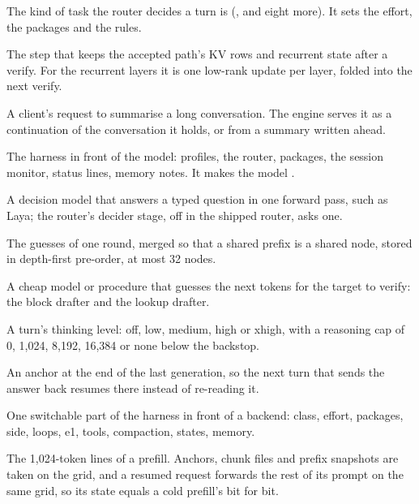 \begin{description}[style=unboxed, leftmargin=0pt, itemsep=.5ex, font=\normalfont\bfseries]
\item[class] The kind of task the router decides a turn is (,  and eight more). It sets the effort, the packages and the rules.

\item[commit] The step that keeps the accepted path's KV rows and recurrent state after a verify. For the recurrent layers it is one low-rank update per layer, folded into the next verify.

\item[compaction] A client's request to summarise a long conversation. The engine serves it as a continuation of the conversation it holds, or from a summary written ahead.

\item[conductor] The harness in front of the model: profiles, the router, packages, the session monitor, status lines, memory notes. It makes the model .

\item[decider] A decision model that answers a typed question in one forward pass, such as Laya; the router's decider stage, off in the shipped router, asks one.

\item[draft tree] The guesses of one round, merged so that a shared prefix is a shared node, stored in depth-first pre-order, at most 32 nodes.

\item[drafter] A cheap model or procedure that guesses the next tokens for the target to verify: the block drafter and the lookup drafter.

\item[effort] A turn's thinking level: off, low, medium, high or xhigh, with a reasoning cap of 0, 1,024, 8,192, 16,384 or none below the backstop.

\item[end anchor] An anchor at the end of the last generation, so the next turn that sends the answer back resumes there instead of re-reading it.

\item[feature group] One switchable part of the harness in front of a backend: class, effort, packages, side, loops, e1, tools, compaction, states, memory.

\item[grid] The 1,024-token lines of a prefill. Anchors, chunk files and prefix snapshots are taken on the grid, and a resumed request forwards the rest of its prompt on the same grid, so its state equals a cold prefill's bit for bit.


\end{description}
